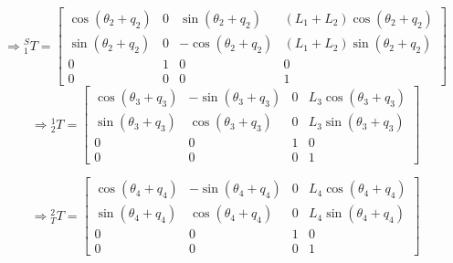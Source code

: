 \documentclass[a4paper]{article}
\begin{document}
\begin{qalist}
			\begin{equation}
				\Rightarrow {}^{S}_{1}T = 
				\begin{bmatrix}
					\cos({\theta}_{2} + {q}_{2}) & 0 & \sin({\theta}_{2} + {q}_{2}) & ({L}_{1} + {L}_{2})\cos({\theta}_{2} + {q}_{2}) \\
					\sin({\theta}_{2} + {q}_{2}) & 0 & -\cos({\theta}_{2} + {q}_{2}) & ({L}_{1} + {L}_{2})\sin({\theta}_{2} + {q}_{2}) \\
					0 & 1 & 0 & 0 \\
					0 & 0 & 0 & 1
				\end{bmatrix}
			\end{equation}
			\begin{equation}
				\Rightarrow {}^{1}_{2}T = 
				\begin{bmatrix}
					\cos({\theta}_{3} + {q}_{3}) & -\sin({\theta}_{3} + {q}_{3}) & 0 & {L}_{3}\cos({\theta}_{3} + {q}_{3}) \\
					\sin({\theta}_{3} + {q}_{3}) & \cos({\theta}_{3} + {q}_{3}) & 0 & {L}_{3}\sin({\theta}_{3} + {q}_{3}) \\
					0 & 0 & 1 & 0 \\
					0 & 0 & 0 & 1
				\end{bmatrix}
			\end{equation}
			
			\begin{equation}
				\Rightarrow {}^{2}_{T}T = 
				\begin{bmatrix}
					\cos({\theta}_{4} + {q}_{4}) & -\sin({\theta}_{4} + {q}_{4}) & 0 & {L}_{4}\cos({\theta}_{4} + {q}_{4}) \\
					\sin({\theta}_{4} + {q}_{4}) & \cos({\theta}_{4} + {q}_{4}) & 0 & {L}_{4}\sin({\theta}_{4} + {q}_{4}) \\
					0 & 0 & 1 & 0 \\
					0 & 0 & 0 & 1
				\end{bmatrix}
			\end{equation}
		

\end{qalist}
\end{document}
